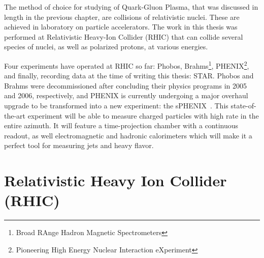 The method of choice for studying of Quark-Gluon Plasma, that was discussed in length in the previous chapter, are collisions of relativistic nuclei. These are achieved in laboratory on particle accelerators. The work in this thesis was performed at Relativistic Heavy-Ion Collider (RHIC) that can collide several species of nuclei, as well as polarized protons, at various energies. 


Four experiments have operated at RHIC so far: Phobos, Brahms\footnote{Broad RAnge Hadron Magnetic Spectrometers}, PHENIX\footnote{Pioneering High Energy Nuclear Interaction eXperiment}, and finally, recording data at the time of writing this thesis: STAR. Phobos and Brahms were decommissioned after concluding their physics programs in 2005 and 2006, respectively, and PHENIX is currently undergoing a major overhaul upgrade to be transformed into a new experiment: the sPHENIX~\cite{sphenix}. This state-of-the-art experiment will be able to measure charged particles with high rate in the entire azimuth. It will feature a time-projection chamber with a continuous readout, as well electromagnetic and hadronic calorimeters which will make it a perfect tool for measuring jets and heavy flavor.


\section{Relativistic Heavy Ion Collider (RHIC)\label{RHIC}}

